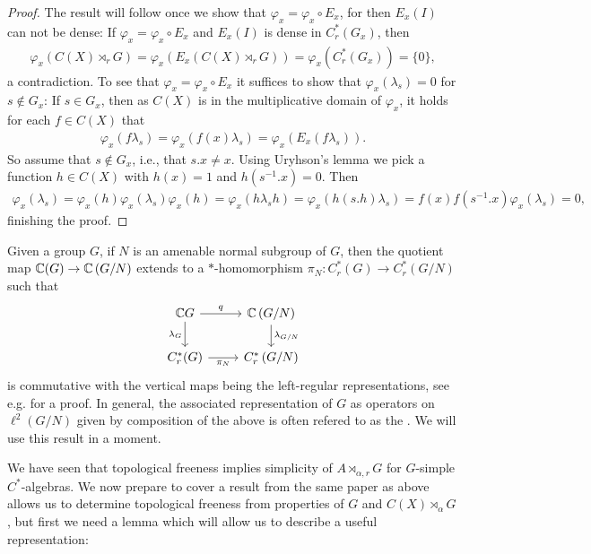 \begin{proof}
	The result will follow once we show that $\varphi_x = \varphi_x \circ E_x$, for then $E_x(I)$ can not be dense: If $\varphi_x = \varphi_x \circ E_x$ and $E_x(I)$ is dense in $C_r^*(G_x)$, then 
	\begin{align*}
		\varphi_x(C(X) \rtimes_r G) = \varphi_x (E_x(C(X) \rtimes_r G)) = \varphi_x(C^*_r(G_x))=\{0\},
	\end{align*}
a contradiction. To see that $\varphi_x = \varphi_x \circ E_x$ it suffices to show that $\varphi_x (\lambda_s) = 0$ for $s \not \in G_x$: If $s \in G_x$, then as $C(X)$ is in the multiplicative domain of $\varphi_x$, it holds for each $f \in C(X)$ that
	\begin{align*}
		\varphi_x(f \lambda_s) =  \varphi_x( f(x) \lambda_s)  =  \varphi_x (E_x( f\lambda_s)).
	\end{align*}
	So assume that $s \not \in G_x$, i.e., that $s.x \neq x$. Using Uryhson's lemma we pick a function $h \in C(X)$ with $h(x) = 1$ and $h(s^{-1}.x) = 0$. Then
	\begin{align*}
		\varphi_x(\lambda_s) =\varphi_x(h)\varphi_x(\lambda_s) \varphi_x(h)= \varphi_x(h\lambda_sh) = \varphi_x(h (s.h)\lambda_s)=f(x)f(s^{-1}.x) \varphi_x(\lambda_s) = 0,
	\end{align*}
	finishing the proof.
\end{proof}
\begin{remark}
	Given a group $G$, if $N$ is an amenable normal subgroup of $G$, then the quotient map $\mathbb{C}( G) \to \mathbb{C} \left(G/N\right)$ extends to a $*$-homomorphism $\pi_N \colon C_r^*(G) \to C_r^*\left( G/N \right)$ such that
\begin{equation}
	\begin{tikzcd}
		\C G \ar[r,"q"] \ar[d,"\lambda_G"'] & \C\left( G/N \right) \ar[d, "\lambda_{G/N}"]\\
		C_r^*(G) \ar[r,"\pi_N"'] & C_r^*\left( G/N \right)
	\end{tikzcd}
\end{equation}
is commutative with the vertical maps being the left-regular representations, see e.g. \cite[Proposition 3]{de2007simplicity} for a proof. In general, the associated representation of $G$ as operators on $\ell^2(G/N)$ given by composition of the above is often refered to as the . We will use this result in a moment.
\label{quotientextend}
\end{remark}
We have seen that topological freeness implies simplicity of $A \rtimes_{\alpha,r} G$ for $G$-simple $C^*$-algebras. We now prepare to cover a result from the same paper as above allows us to determine topological freeness from properties of $G$ and $C(X)\rtimes_\alpha G$, but first we need a lemma which will allow us to describe a useful representation:
